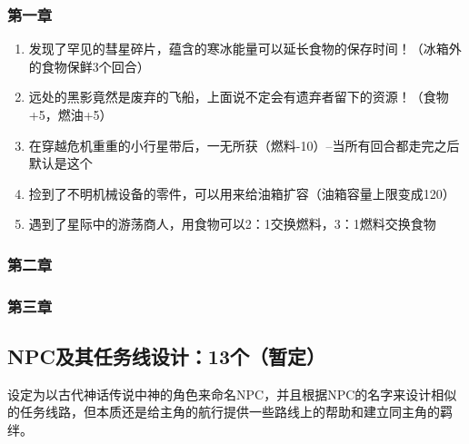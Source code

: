 \documentclass{ctexart}
\begin{document}
			\subsubsection{第一章}
				\begin{enumerate}
					\item 发现了罕见的彗星碎片，蕴含的寒冰能量可以延长食物的保存时间！（冰箱外的食物保鲜3个回合）
					\item 远处的黑影竟然是废弃的飞船，上面说不定会有遗弃者留下的资源！（食物+5，燃油+5）
					\item 在穿越危机重重的小行星带后，一无所获（燃料-10）--当所有回合都走完之后默认是这个
					\item 捡到了不明机械设备的零件，可以用来给油箱扩容（油箱容量上限变成120）
					\item 遇到了星际中的游荡商人，用食物可以2：1交换燃料，3：1燃料交换食物
				\end{enumerate}
			\subsubsection{第二章}
			\subsubsection{第三章}
		\subsection{NPC及其任务线设计：13个（暂定）} %
		设定为以古代神话传说中神的角色来命名NPC，并且根据NPC的名字来设计相似的任务线路，但本质还是给主角的航行提供一些路线上的帮助和建立同主角的羁绊。%
\end{document}
